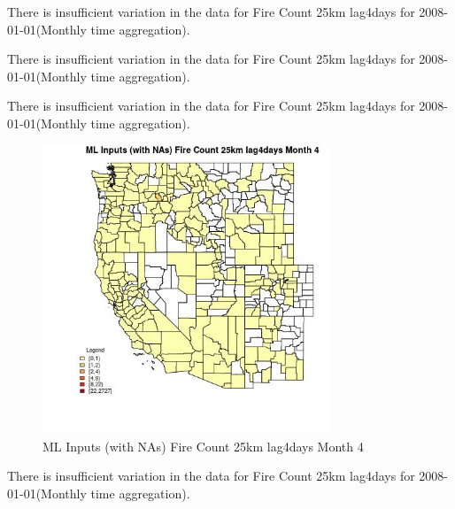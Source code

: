 There is insufficient variation in the data for Fire Count 25km lag4days for 2008-01-01(Monthly time aggregation). 
 

There is insufficient variation in the data for Fire Count 25km lag4days for 2008-01-01(Monthly time aggregation). 
 

There is insufficient variation in the data for Fire Count 25km lag4days for 2008-01-01(Monthly time aggregation). 
 

\begin{figure} 
\centering  
\includegraphics[width=0.77\textwidth]{Code_Outputs/Report_ML_input_PM25_Step4_part_f_de_duplicated_aveswNAs_CountyFire_Count_25km_lag4daysmedianMonth4.jpg} 
\caption{\label{fig:Report_ML_input_PM25_Step4_part_f_de_duplicated_aveswNAsCountyFire_Count_25km_lag4daysmedianMonth4}ML Inputs (with NAs) Fire Count 25km lag4days Month 4} 
\end{figure} 
 

There is insufficient variation in the data for Fire Count 25km lag4days for 2008-01-01(Monthly time aggregation). 
 


